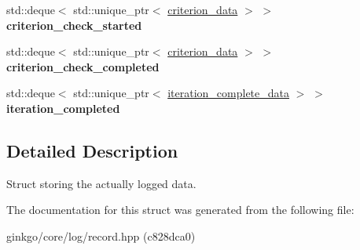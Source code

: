 \begin{DoxyCompactItemize}
\item 
\mbox{\label{structgko_1_1log_1_1Record_1_1logged__data_abfe68110796c0a094c937d3a8787cc04}} 
std\+::deque$<$ std\+::unique\+\_\+ptr$<$ \hyperlink{structgko_1_1log_1_1criterion__data}{criterion\+\_\+data} $>$ $>$ {\bfseries criterion\+\_\+check\+\_\+started}
\item 
\mbox{\label{structgko_1_1log_1_1Record_1_1logged__data_abf13cae8d7e797ae6c2b4ddf9a9cb33a}} 
std\+::deque$<$ std\+::unique\+\_\+ptr$<$ \hyperlink{structgko_1_1log_1_1criterion__data}{criterion\+\_\+data} $>$ $>$ {\bfseries criterion\+\_\+check\+\_\+completed}
\item 
\mbox{\label{structgko_1_1log_1_1Record_1_1logged__data_a54f71b0aecebe7a7957eb5cfba7395e3}} 
std\+::deque$<$ std\+::unique\+\_\+ptr$<$ \hyperlink{structgko_1_1log_1_1iteration__complete__data}{iteration\+\_\+complete\+\_\+data} $>$ $>$ {\bfseries iteration\+\_\+completed}
\end{DoxyCompactItemize}


\subsection{Detailed Description}
Struct storing the actually logged data. 

The documentation for this struct was generated from the following file\+:\begin{DoxyCompactItemize}
\item 
ginkgo/core/log/record.\+hpp (c828dca0)\end{DoxyCompactItemize}
